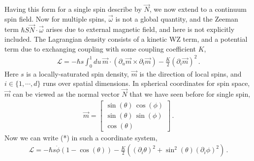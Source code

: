 \documentclass[11pt, onesided]{book}
\theoremstyle{break}
\theoremstyle{break}
\newcommand{\pd}{\partial}
\newcommand{\bmat}[1]{\begin{bmatrix} #1 \end{bmatrix}}
\begin{document}
Having this form for a single spin describe by $\vec{N}$, we now extend to a continuum spin field. Now for multiple spins, $\vec{\omega}$ is not a global quantity, and the Zeeman term $\hbar S\vec{N}\cdot \vec{\omega}$ arises due to external magnetic field, and here is not explicitly included. The Lagrangian density consists of a kinetic WZ term, and a potential term due to exchanging coupling with some coupling coefficient $K$, 
\begin{align*}
\mathcal{L} = -\hbar s\int_0^1 du\, \vec{m}\cdot \left( \pd_u \vec{m}\times \pd_t \vec{m}\right)  - \frac{K}{2}(\pd_i \vec{m})^2\,. \tag{*}
\end{align*}
Here $s$ is a locally-saturated spin density, $\vec{m}$ is the direction of local spins, and $i\in \{1,\cdots, d\}$ runs over spatial dimensions. In spherical coordinates for spin space, $\vec{m}$ can be viewed as the normal vector $\vec{N}$ that we have seen before for single spin,
\begin{align*}
\vec{m} = \bmat{\sin(\theta)\,\cos(\phi)\\
\sin(\theta)\, \sin(\phi)\\
\cos(\theta)}\,.
\end{align*}
Now we can write (*) in such a coordinate system, 
\begin{align*}
\mathcal{L} = -\hbar s\dot{\phi}(1-\cos(\theta)) - \frac{K}{2}\left( (\pd_i \theta)^2 + \sin^2(\theta) (\pd_i \phi)^2\right)\,.
\end{align*}
\end{document}
